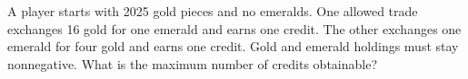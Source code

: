 A player starts with 2025 gold pieces and no emeralds. One allowed trade exchanges 16 gold for one emerald and earns one credit. The other exchanges one emerald for four gold and earns one credit. Gold and emerald holdings must stay nonnegative. What is the maximum number of credits obtainable?
